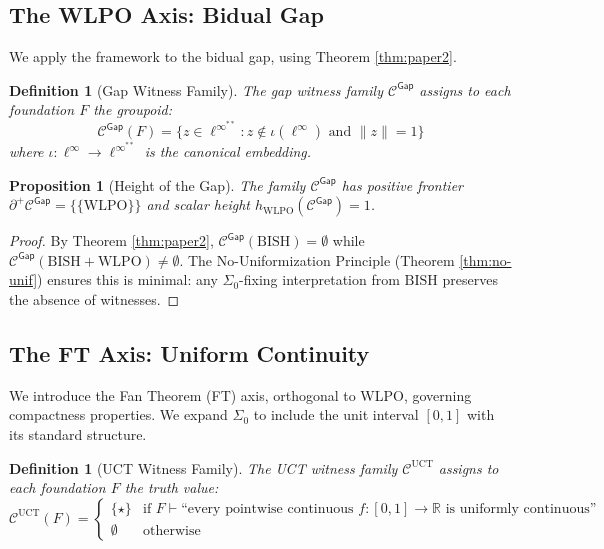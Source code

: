 \documentclass[11pt]{article}
\newtheorem{definition}[theorem]{Definition}
\newtheorem{proposition}[theorem]{Proposition}
\newcommand{\R}{\mathbb{R}}
\newcommand{\WLPO}{\mathrm{WLPO}}
\newcommand{\BISH}{\mathrm{BISH}}
\newcommand{\SigmaZero}{\Sigma_{0}}
\newcommand{\linf}{\ell^\infty}
\newcommand{\Frontierpos}{\partial^{+}}
\begin{document}
\subsection{The WLPO Axis: Bidual Gap}

We apply the framework to the bidual gap, using Theorem \ref{thm:paper2}.

\begin{definition}[Gap Witness Family]
The gap witness family $\mathcal{C}^{\mathsf{Gap}}$ assigns to each foundation $F$ the groupoid:
\[
\mathcal{C}^{\mathsf{Gap}}(F) = \{z \in \linf^{**} : z \notin \iota(\linf) \text{ and } \|z\| = 1\}
\]
where $\iota: \linf \to \linf^{**}$ is the canonical embedding.
\end{definition}

\begin{proposition}[Height of the Gap]\label{prop:gap-height}
The family $\mathcal{C}^{\mathsf{Gap}}$ has positive frontier $\Frontierpos\mathcal{C}^{\mathsf{Gap}}=\{\{\WLPO\}\}$ and scalar height $h_{\text{WLPO}}(\mathcal{C}^{\mathsf{Gap}}) = 1$.
\end{proposition}
\begin{proof}
By Theorem \ref{thm:paper2}, $\mathcal{C}^{\mathsf{Gap}}(\BISH) = \emptyset$ while $\mathcal{C}^{\mathsf{Gap}}(\BISH + \WLPO) \neq \emptyset$. The No-Uniformization Principle (Theorem \ref{thm:no-unif}) ensures this is minimal: any $\SigmaZero$-fixing interpretation from $\BISH$ preserves the absence of witnesses.
\end{proof}

\subsection{The FT Axis: Uniform Continuity}

We introduce the Fan Theorem (FT) axis, orthogonal to WLPO, governing compactness properties. We expand $\SigmaZero$ to include the unit interval $[0,1]$ with its standard structure.

\begin{definition}[UCT Witness Family]
The UCT witness family $\mathcal{C}^{\mathrm{UCT}}$ assigns to each foundation $F$ the truth value:
\[
\mathcal{C}^{\mathrm{UCT}}(F) = \begin{cases}
\{\star\} & \text{if } F \vdash \text{``every pointwise continuous } f:[0,1]\to\R \text{ is uniformly continuous''} \\
\emptyset & \text{otherwise}
\end{cases}
\]
\end{definition}
\end{document}
